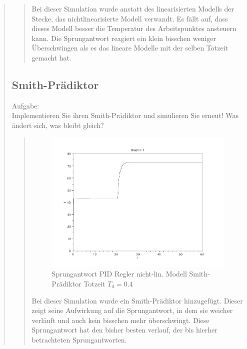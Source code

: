 \begin{quote}
\begin{quote}
        Bei dieser Simulation wurde anstatt des linearisierten Modells der Stecke, das nichtlinearisierte Modell
        verwandt. Es fällt auf, dass dieses Modell besser die Temperatur des Arbeitspunktes ansteuern kann. Die
        Sprungantwort reagiert ein klein bisschen weniger Überschwingen als es das lineare Modelle mit der selben
        Totzeit gemacht hat.
    
    \end{quote}
    
    \subsection{Smith-Prädiktor}
    Aufgabe:\\
    Implementieren Sie ihren Smith-Prädiktor und simulieren Sie erneut! Was ändert sich, was bleibt gleich?\vspace{1em}
    
    \begin{quote}
        \begin{figure}[H]
        \centering
            \includegraphics[scale=0.7, trim = 0cm 0cm 0cm 0cm, clip]{./Bilder/4_3_Td_04}
               \caption{Sprungantwort PID Regler nicht-lin. Modell Smith-Prädiktor Totzeit $T_d = 0.4$}
        \end{figure}
    
        Bei dieser Simulation wurde ein Smith-Prädiktor hinzugefügt. Dieser zeigt seine Aufwirkung auf die
        Sprungantwort, in dem sie weicher verläuft und auch kein bisschen mehr überschwingt. Diese Sprungantwort hat den
        bisher besten verlauf, der bis hierher betrachteten Sprungantworten.
    

\end{quote}
\end{quote}
